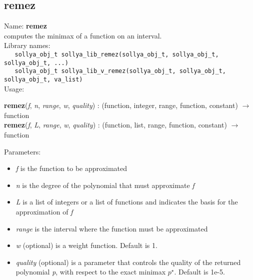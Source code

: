 \subsection{remez}
\label{labremez}
\noindent Name: \textbf{remez}\\
\phantom{aaa}computes the minimax of a function on an interval.\\[0.2cm]
\noindent Library names:\\
\verb|   sollya_obj_t sollya_lib_remez(sollya_obj_t, sollya_obj_t, sollya_obj_t, ...)|\\
\verb|   sollya_obj_t sollya_lib_v_remez(sollya_obj_t, sollya_obj_t, sollya_obj_t, va_list)|\\[0.2cm]
\noindent Usage: 
\begin{center}
\textbf{remez}(\emph{f}, \emph{n}, \emph{range}, \emph{w}, \emph{quality}) : (\textsf{function}, \textsf{integer}, \textsf{range}, \textsf{function}, \textsf{constant}) $\rightarrow$ \textsf{function}\\
\textbf{remez}(\emph{f}, \emph{L}, \emph{range}, \emph{w}, \emph{quality}) : (\textsf{function}, \textsf{list}, \textsf{range}, \textsf{function}, \textsf{constant}) $\rightarrow$ \textsf{function}\\
\end{center}
Parameters: 
\begin{itemize}
\item \emph{f} is the function to be approximated
\item \emph{n} is the degree of the polynomial that must approximate \emph{f}
\item \emph{L} is a list of integers or a list of functions and indicates the basis for the approximation of \emph{f}
\item \emph{range} is the interval where the function must be approximated
\item \emph{w} (optional) is a weight function. Default is 1.
\item \emph{quality} (optional) is a parameter that controls the quality of the returned polynomial \emph{p}, with respect to the exact minimax $p^\star$. Default is 1e-5.
\end{itemize}
